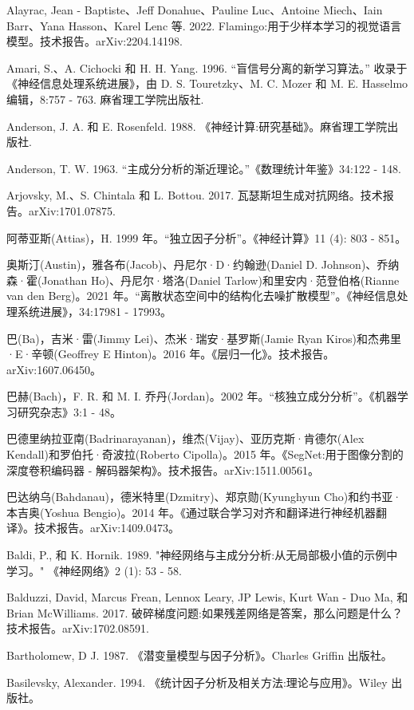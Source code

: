 \documentclass[10pt]{report}
\begin{document}
Alayrac, Jean - Baptiste、Jeff Donahue、Pauline Luc、Antoine Miech、Iain Barr、Yana Hasson、Karel Lenc 等. 2022. Flamingo:用于少样本学习的视觉语言模型。技术报告。arXiv:2204.14198.

Amari, S.、A. Cichocki 和 H. H. Yang. 1996. “盲信号分离的新学习算法。” 收录于《神经信息处理系统进展》，由 D. S. Touretzky、M. C. Mozer 和 M. E. Hasselmo 编辑，8:757 - 763. 麻省理工学院出版社.

Anderson, J. A. 和 E. Rosenfeld. 1988. 《神经计算:研究基础》。麻省理工学院出版社.

Anderson, T. W. 1963. “主成分分析的渐近理论。”《数理统计年鉴》34:122 - 148.

Arjovsky, M.、S. Chintala 和 L. Bottou. 2017. 瓦瑟斯坦生成对抗网络。技术报告。arXiv:1701.07875.

阿蒂亚斯(Attias)，H. 1999 年。“独立因子分析”。《神经计算》11 (4): 803 - 851。

奥斯汀(Austin)，雅各布(Jacob)、丹尼尔·D·约翰逊(Daniel D. Johnson)、乔纳森·霍(Jonathan Ho)、丹尼尔·塔洛(Daniel Tarlow)和里安内·范登伯格(Rianne van den Berg)。2021 年。“离散状态空间中的结构化去噪扩散模型”。《神经信息处理系统进展》，34:17981 - 17993。

巴(Ba)，吉米·雷(Jimmy Lei)、杰米·瑞安·基罗斯(Jamie Ryan Kiros)和杰弗里·E·辛顿(Geoffrey E Hinton)。2016 年。《层归一化》。技术报告。arXiv:1607.06450。

巴赫(Bach)，F. R. 和 M. I. 乔丹(Jordan)。2002 年。“核独立成分分析”。《机器学习研究杂志》3:1 - 48。

巴德里纳拉亚南(Badrinarayanan)，维杰(Vijay)、亚历克斯·肯德尔(Alex Kendall)和罗伯托·奇波拉(Roberto Cipolla)。2015 年。《SegNet:用于图像分割的深度卷积编码器 - 解码器架构》。技术报告。arXiv:1511.00561。

巴达纳乌(Bahdanau)，德米特里(Dzmitry)、郑京勋(Kyunghyun Cho)和约书亚·本吉奥(Yoshua Bengio)。2014 年。《通过联合学习对齐和翻译进行神经机器翻译》。技术报告。arXiv:1409.0473。

Baldi, P., 和 K. Hornik. 1989. "神经网络与主成分分析:从无局部极小值的示例中学习。" 《神经网络》2 (1): 53 - 58.

Balduzzi, David, Marcus Frean, Lennox Leary, JP Lewis, Kurt Wan - Duo Ma, 和 Brian McWilliams. 2017. 破碎梯度问题:如果残差网络是答案，那么问题是什么？技术报告。arXiv:1702.08591.

Bartholomew, D J. 1987. 《潜变量模型与因子分析》。Charles Griffin 出版社。

Basilevsky, Alexander. 1994. 《统计因子分析及相关方法:理论与应用》。Wiley 出版社。
\end{document}
